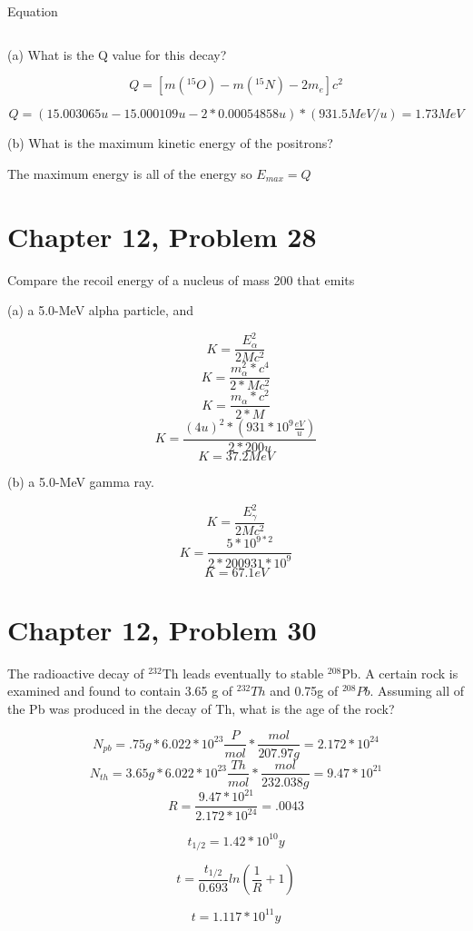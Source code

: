 \documentclass[12pt]{article}
\begin{document}
Equation

$$  $$

(a) What is the Q value for this decay?

$$ Q = [m({}^{15}O) - m({}^{15}N) - 2m_e]c^2$$

$$ Q = (15.003065u - 15.000109u - 2*0.00054858u)*(931.5 MeV/u) = 1.73MeV $$

(b) What is the maximum kinetic energy of the positrons?

The maximum energy is all of the energy so $ E_{max} = Q $


\section*{Chapter 12, Problem 28}

Compare the recoil energy of a nucleus of mass 200 that emits

(a) a 5.0-MeV alpha particle, and

$$ K = \frac{E_{\alpha}^2}{2Mc^2} $$
$$ K = \frac{m_\alpha^2*c^4}{2*Mc^2} $$
$$ K = \frac{m_\alpha*c^2}{2*M} $$
$$ K = \frac{(4u)^2*(931*10^9\frac{eV}{u})}{2*200u} $$
$$ K = 37.2 MeV $$

(b) a 5.0-MeV gamma ray.

$$ K = \frac{E_{\gamma}^2}{2Mc^2} $$
$$ K = \frac{5*10^{9 * 2}}{2 * 200 931*10^9} $$
$$ K = 67.1 eV $$

\section*{Chapter 12, Problem 30}

The radioactive decay of ${}^{232}$Th leads eventually to stable ${}^{208}$Pb. A certain rock is examined and found to contain 3.65 g of ${}^{232}Th$ and 0.75g of ${}^{208}Pb$. Assuming all of the Pb was produced in the decay of Th, what is the age of the rock?


$$ N_{pb} = .75g * 6.022*10^{23} \frac{P}{mol} * \frac{mol}{207.97g} = 2.172 * 10^{24} $$
$$ N_{th} = 3.65g * 6.022*10^{23} \frac{Th}{mol} * \frac{mol}{232.038g} = 9.47 * 10^{21} $$
$$ R = \frac{9.47 * 10^21}{2.172*10^24} = .0043 $$

$$ t_{1/2} = 1.42*10^10y $$

$$ t = \frac{t_{1/2}}{0.693}ln(\frac{1}{R} + 1) $$

$$ t= 1.117 * 10^{11} y$$
\end{document}

